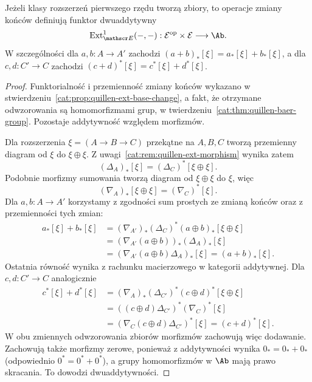 \begin{stwierdzenie}\label{cat:prop:quillen-ext-biadditive}
Jeżeli klasy rozszerzeń pierwszego rzędu tworzą zbiory, to operacje zmiany końców definiują funktor dwuaddytywny
\[
 \operatorname{Ext}^1_{\mathscr E}(-,-):
 \mathcal E^{\mathrm{op}}\times\mathcal E\longrightarrow\Ab.
\]
W szczególności dla $a,b:A\to A'$ zachodzi $(a+b)_*[\xi]=a_*[\xi]+b_*[\xi]$, a dla $c,d:C'\to C$ zachodzi $(c+d)^*[\xi]=c^*[\xi]+d^*[\xi]$.
\end{stwierdzenie}
\begin{proof}
Funktorialność i przemienność zmiany końców wykazano w stwierdzeniu~\ref{cat:prop:quillen-ext-base-change}, a fakt, że otrzymane odwzorowania są homomorfizmami grup, w twierdzeniu~\ref{cat:thm:quillen-baer-group}. Pozostaje addytywność względem morfizmów.

Dla rozszerzenia $\xi=(A\to B\to C)$ przekątne na $A,B,C$ tworzą przemienny diagram od $\xi$ do $\xi\oplus\xi$. Z uwagi~\ref{cat:rem:quillen-ext-morphism} wynika zatem
\[
 (\Delta_A)_*[\xi]=(\Delta_C)^*[\xi\oplus\xi].
\]
Podobnie morfizmy sumowania tworzą diagram od $\xi\oplus\xi$ do $\xi$, więc
\[
 (\nabla_A)_*[\xi\oplus\xi]=(\nabla_C)^*[\xi].
\]
Dla $a,b:A\to A'$ korzystamy z zgodności sum prostych ze zmianą końców oraz z przemienności tych zmian:
\[
\begin{aligned}
 a_*[\xi]+b_*[\xi]
 &= (\nabla_{A'})_*(\Delta_C)^*(a\oplus b)_*[\xi\oplus\xi]\\
 &= (\nabla_{A'}(a\oplus b))_*(\Delta_A)_*[\xi]\\
 &= (\nabla_{A'}(a\oplus b)\Delta_A)_*[\xi]
 = (a+b)_*[\xi].
\end{aligned}
\]
Ostatnia równość wynika z rachunku macierzowego w kategorii addytywnej. Dla $c,d:C'\to C$ analogicznie
\[
\begin{aligned}
 c^*[\xi]+d^*[\xi]
 &= (\nabla_A)_*(\Delta_{C'})^*(c\oplus d)^*[\xi\oplus\xi]\\
 &= ((c\oplus d)\Delta_{C'})^*(\nabla_C)^*[\xi]\\
 &= (\nabla_C(c\oplus d)\Delta_{C'})^*[\xi]
 = (c+d)^*[\xi].
\end{aligned}
\]
W obu zmiennych odwzorowania zbiorów morfizmów zachowują więc dodawanie. Zachowują także morfizmy zerowe, ponieważ z addytywności wynika $0_*=0_*+0_*$ (odpowiednio $0^*=0^*+0^*$), a grupy homomorfizmów w $\Ab$ mają prawo skracania. To dowodzi dwuaddytywności.
\end{proof}


